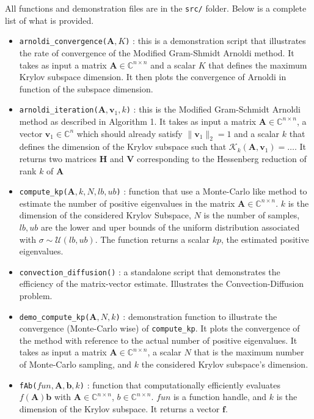 \documentclass[11pt]{article}
\numberwithin{equation}{section}
\begin{document}
All functions and demonstration files are in the \texttt{src/} folder. Below is a complete list of what is provided.
\begin{itemize}
    \item \texttt{arnoldi\_convergence($\mathbf{A},K$)} : this is a demonstration script that illustrates the rate of convergence of the Modified Gram-Shmidt Arnoldi method. It takes as input a matrix $\mathbf{A}\in\mathbb{C}^{n\times n}$ and a scalar $K$ that defines the maximum Krylov subspace dimension. It then plots the convergence of Arnoldi in function of the subspace dimension.
    \item \texttt{arnoldi\_iteration($\mathbf{A},\mathbf{v}_1,k$)} : this is the Modified Gram-Schmidt Arnoldi method as described in Algorithm 1. It takes as input a matrix $\mathbf{A}\in\mathbb{C}^{n\times n}$, a vector $\mathbf{v}_1\in\mathbb{C}^n$ which should already satisfy $\|\mathbf{v}_1\|_2 = 1$ and a scalar $k$ that defines the dimension of the Krylov subspace such that $\mathcal{K}_k(\mathbf{A},\mathbf{v}_1) = \dots$. It returns two matrices $\mathbf{H}$ and $\mathbf{V}$ corresponding to the Hessenberg reduction of rank $k$ of $\mathbf{A}$
    \item \texttt{compute\_kp($\mathbf{A},k,N,lb,ub$)} : function that use a Monte-Carlo like method to estimate the number of positive eigenvalues in the matrix $\mathbf{A}\in\mathbb{C}^{n\times n}$. $k$ is the dimension of the considered Krylov Subspace, $N$ is the number of samples, $lb,ub$ are the lower and uper bounds of the uniform distribution associated with $\sigma\sim\mathcal{U}(lb,ub)$. The function returns a scalar $kp$, the estimated positive eigenvalues.
    \item \texttt{convection\_diffusion()} : a standalone script that demonstrates the efficiency of the matrix-vector estimate. Illustrates the Convection-Diffusion problem.
    \item \texttt{demo\_compute\_kp($\mathbf{A},N,k$)} : demonstration function to illustrate the convergence (Monte-Carlo wise) of \texttt{compute\_kp}. It plots the convergence of the method with reference to the actual number of positive eigenvalues. It takes as input a matrix $\mathbf{A}\in\mathbb{C}^{n\times n}$, a scalar $N$ that is the maximum number of Monte-Carlo sampling, and $k$ the considered Krylov subspace's dimension.
    \item \texttt{fAb($fun, \mathbf{A},\mathbf{b},k$)} : function that computationally efficiently evaluates $f(\mathbf{A})\mathbf{b}$ with $\mathbf{A}\in\mathbb{C}^{n\times n}$, $b\in\mathbb{C}^{n\times n}$. $fun$ is a function handle, and $k$ is the dimension of the Krylov subspace. It returns a vector $\mathbf{f}$.

\end{itemize}
\end{document}
